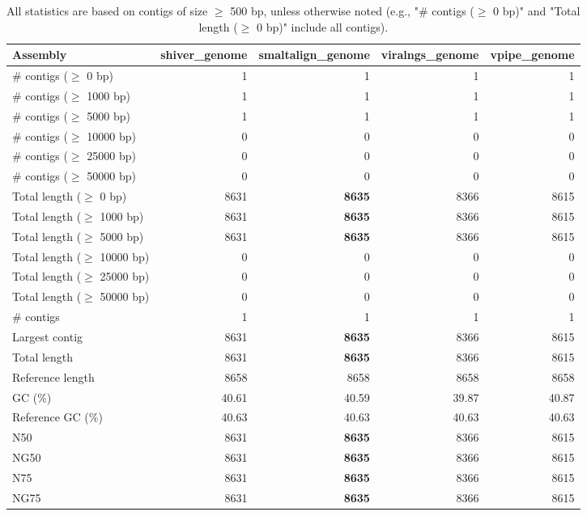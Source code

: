 \documentclass[12pt,a4paper]{article}
\begin{document}
\begin{table}[ht]
\begin{center}
\caption{All statistics are based on contigs of size $\geq$ 500 bp, unless otherwise noted (e.g., "\# contigs ($\geq$ 0 bp)" and "Total length ($\geq$ 0 bp)" include all contigs).}
\begin{tabular}{|l*{4}{|r}|}
\hline
Assembly & shiver\_genome & smaltalign\_genome & viralngs\_genome & vpipe\_genome \\ \hline
\# contigs ($\geq$ 0 bp) & 1 & 1 & 1 & 1 \\ \hline
\# contigs ($\geq$ 1000 bp) & 1 & 1 & 1 & 1 \\ \hline
\# contigs ($\geq$ 5000 bp) & 1 & 1 & 1 & 1 \\ \hline
\# contigs ($\geq$ 10000 bp) & 0 & 0 & 0 & 0 \\ \hline
\# contigs ($\geq$ 25000 bp) & 0 & 0 & 0 & 0 \\ \hline
\# contigs ($\geq$ 50000 bp) & 0 & 0 & 0 & 0 \\ \hline
Total length ($\geq$ 0 bp) & 8631 & {\bf 8635} & 8366 & 8615 \\ \hline
Total length ($\geq$ 1000 bp) & 8631 & {\bf 8635} & 8366 & 8615 \\ \hline
Total length ($\geq$ 5000 bp) & 8631 & {\bf 8635} & 8366 & 8615 \\ \hline
Total length ($\geq$ 10000 bp) & 0 & 0 & 0 & 0 \\ \hline
Total length ($\geq$ 25000 bp) & 0 & 0 & 0 & 0 \\ \hline
Total length ($\geq$ 50000 bp) & 0 & 0 & 0 & 0 \\ \hline
\# contigs & 1 & 1 & 1 & 1 \\ \hline
Largest contig & 8631 & {\bf 8635} & 8366 & 8615 \\ \hline
Total length & 8631 & {\bf 8635} & 8366 & 8615 \\ \hline
Reference length & 8658 & 8658 & 8658 & 8658 \\ \hline
GC (\%) & 40.61 & 40.59 & 39.87 & 40.87 \\ \hline
Reference GC (\%) & 40.63 & 40.63 & 40.63 & 40.63 \\ \hline
N50 & 8631 & {\bf 8635} & 8366 & 8615 \\ \hline
NG50 & 8631 & {\bf 8635} & 8366 & 8615 \\ \hline
N75 & 8631 & {\bf 8635} & 8366 & 8615 \\ \hline
NG75 & 8631 & {\bf 8635} & 8366 & 8615 \\ \hline

\end{tabular}
\end{center}
\end{table}
\end{document}
